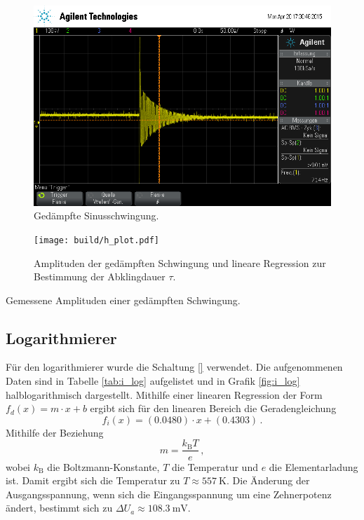 \begin{figure}[!h]
    \centering
    \includegraphics[width=0.8\linewidth]{data/scope_18.png}
    \caption{Gedämpfte Sinusschwingung.}
    \label{fig:ged_sinus}
\end{figure}

\begin{figure}[!h]
    \centering
    \texttt{[image: build/h\_plot.pdf]}
    \caption{Amplituden der gedämpften Schwingung und lineare Regression zur Bestimmung der Abklingdauer $\tau$.}
    \label{fig:ged_schwing}
\end{figure}

\begin{table}[!h]
    \centering
    \caption{Gemessene Amplituden einer gedämpften Schwingung.}
    \label{tab:ged_schwing}
    

\end{table}

\subsection{Logarithmierer} %
\label{sub:logarithmierer}

Für den logarithmierer wurde die Schaltung \ref{} verwendet.
Die aufgenommenen Daten sind in Tabelle \ref{tab:i_log} aufgelistet und in Grafik \ref{fig:i_log} halblogarithmisch dargestellt.
Mithilfe einer linearen Regression der Form $f_{d}(x) = m \cdot x + b$ ergibt sich für den linearen Bereich die Geradengleichung
\begin{equation*}
    f_{i}(x) = (\num{0.0480}) \cdot x + (\num{0.4303})\,.
\end{equation*}
Mithilfe der Beziehung
\begin{equation*}
    m = \frac{k_\mathrm{B} T}{e}\,,
\end{equation*}
wobei $k_\mathrm{B}$ die Boltzmann-Konstante, $T$ die Temperatur und $e$ die Elementarladung ist.
Damit ergibt sich die Temperatur zu $T \approx \SI{557}{\kelvin}$.
Die Änderung der Ausgangsspannung, wenn sich die Eingangsspannung um eine Zehnerpotenz ändert, bestimmt sich zu $\Delta U_a \approx \SI{108.3}{\milli\volt}$.

